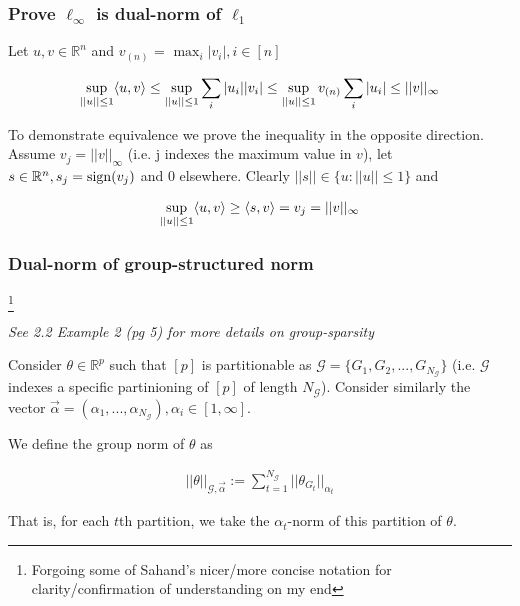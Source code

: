 \documentclass[11pt]{article}
\begin{document}
\subsubsection{Prove $\ell_\infty$ is dual-norm of $\ell_1$}

Let $u,v \in \mathbb{R}^n$ and $v_{(n)}$ = $\max_i |v_i|, i \in [n]$

\begin{gather*}
    \sup_{||u||\leq 1} \langle u,v\rangle
    \leq 
    \sup_{||u||\leq 1} \sum_i |u_i||v_i|
    \leq 
    \sup_{||u|| \leq 1}  v_{(n)} \sum_i |u_i|
    \leq 
    ||v||_\infty 
\end{gather*}

To demonstrate equivalence we prove the inequality in the opposite direction. Assume $v_j = ||v||_\infty$ (i.e. j indexes the maximum value in $v$), let $s \in \mathbb{R}^n, s_j = \operatorname{sign}(v_j)$ and $0$ elsewhere. Clearly $||s|| \in \{u: ||u||\leq 1\}$ and 

\begin{gather*}
    \sup_{||u||\leq 1} \langle u, v\rangle
    \geq 
    \langle s, v\rangle
    =
    v_j 
    =
    ||v||_\infty
\end{gather*}

\subsubsection{Dual-norm of group-structured norm}
    \footnote{Forgoing some of Sahand's nicer/more concise notation for clarity/confirmation of understanding on my end}

{\it See 2.2 Example 2 (pg 5) for more details on group-sparsity} \newline 

Consider $\theta \in \mathbb{R}^p$ such that  $[p]$ is partitionable as $\mathcal{G} = \{G_1, G_2, ..., G_{N_\mathcal{G}}\}$ (i.e. $\mathcal{G}$ indexes a specific partinioning of $[p]$ of length $N_{\mathcal{G}}$).
Consider similarly the vector $\overrightarrow{\alpha} = (\alpha_1, ..., \alpha_{N_\mathcal{G}}), \alpha_i \in [1, \infty]$. 

We define the group norm of $\theta$ as 

\begin{gather*}
    ||\theta||_{\mathcal{G}, \overrightarrow{\alpha}}
    := 
    \sum_{t=1}^{N_\mathcal{G}} ||\theta_{G_t}||_{\alpha_t}
\end{gather*}

That is, for each $t$th partition, we take the $\alpha_t$-norm of this partition of $\theta$. \newline 
\end{document}
